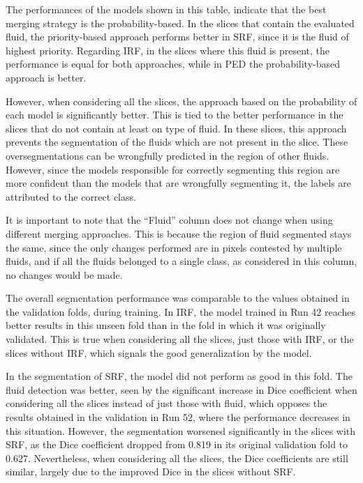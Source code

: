 The performances of the models shown in this table, indicate that the best merging strategy is the probability-based. In the slices that contain the evaluated fluid, the priority-based approach performs better in SRF, since it is the fluid of highest priority. Regarding IRF, in the slices where this fluid is present, the performance is equal for both approaches, while in PED the probability-based approach is better.
\par
However, when considering all the slices, the approach based on the probability of each model is significantly better. This is tied to the better performance in the slices that do not contain at least on type of fluid. In these slices, this approach prevents the segmentation of the fluids which are not present in the slice. These oversegmentations can be wrongfully predicted in the region of other fluids. However, since the models responsible for correctly segmenting this region are more confident than the models that are wrongfully segmenting it, the labels are attributed to the correct class.
\par
It is important to note that the ``Fluid'' column does not change when using different merging approaches. This is because the region of fluid segmented stays the same, since the only changes performed are in pixels contested by multiple fluids, and if all the fluids belonged to a single class, as considered in this column, no changes would be made.
\par
The overall segmentation performance was comparable to the values obtained in the validation folds, during training. In IRF, the model trained in Run 42 reaches better results in this unseen fold than in the fold in which it was originally validated. This is true when considering all the slices, just those with IRF, or the slices without IRF, which signals the good generalization by the model.
\par
In the segmentation of SRF, the model did not perform as good in this fold. The fluid detection was better, seen by the significant increase in Dice coefficient when considering all the slices instead of just those with fluid, which opposes the results obtained in the validation in Run 52, where the performance decreases in this situation. However, the segmentation worsened significantly in the slices with SRF, as the Dice coefficient dropped from 0.819 in its original validation fold to 0.627. Nevertheless, when considering all the slices, the Dice coefficients are still similar, largely due to the improved Dice in the slices without SRF.
\par
